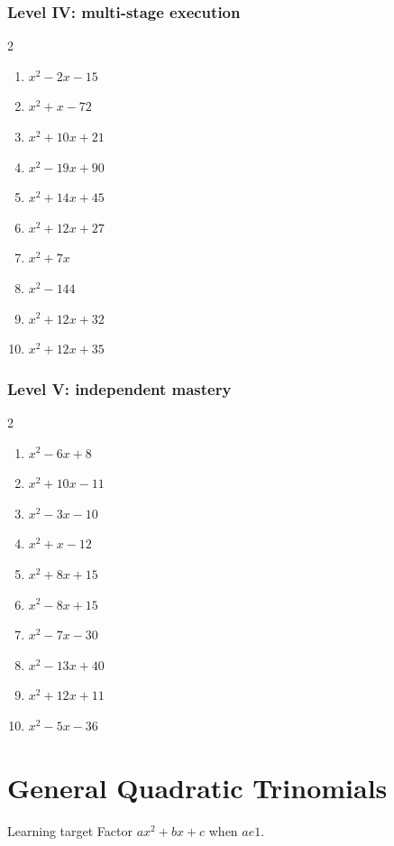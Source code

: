 \documentclass[11pt,oneside]{book}
\begin{document}
\subsection*{Level IV: multi-stage execution}
\begin{multicols}{2}
\begin{enumerate}[leftmargin=*,label=\textbf{\arabic*.},itemsep=0.65\baselineskip]
\item $ x^{2} - 2 x - 15 $
\item $ x^{2} + x - 72 $
\item $ x^{2} + 10 x + 21 $
\item $ x^{2} - 19 x + 90 $
\item $ x^{2} + 14 x + 45 $
\item $ x^{2} + 12 x + 27 $
\item $ x^{2} + 7 x $
\item $ x^{2} - 144 $
\item $ x^{2} + 12 x + 32 $
\item $ x^{2} + 12 x + 35 $
\end{enumerate}
\end{multicols}
\subsection*{Level V: independent mastery}
\begin{multicols}{2}
\begin{enumerate}[leftmargin=*,label=\textbf{\arabic*.},itemsep=0.65\baselineskip]
\item $ x^{2} - 6 x + 8 $
\item $ x^{2} + 10 x - 11 $
\item $ x^{2} - 3 x - 10 $
\item $ x^{2} + x - 12 $
\item $ x^{2} + 8 x + 15 $
\item $ x^{2} - 8 x + 15 $
\item $ x^{2} - 7 x - 30 $
\item $ x^{2} - 13 x + 40 $
\item $ x^{2} + 12 x + 11 $
\item $ x^{2} - 5 x - 36 $
\end{enumerate}
\end{multicols}
\chapter{General Quadratic Trinomials}
\begin{rulebox}{Learning target}
Factor $ax^2+bx+c$ when $a
e1$.
\end{rulebox}
\end{document}
